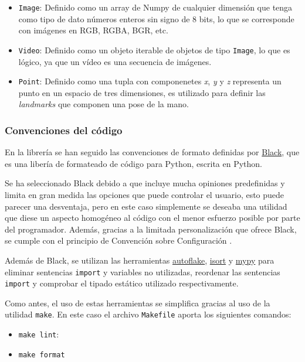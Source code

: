 \begin{itemize}
    \item \texttt{Image}: Definido como un array de Numpy de cualquier dimensión
    que tenga como tipo de dato números enteros sin signo de 8 bits, lo que se
    corresponde con imágenes en RGB, RGBA, BGR, etc.
    \item \texttt{Video}: Definido como un objeto iterable de objetos de tipo
    \texttt{Image}, lo que es lógico, ya que un vídeo es una secuencia de
    imágenes.
    \item \texttt{Point}: Definido como una tupla con componenetes \textit{x},
    \textit{y} y \textit{z} representa un punto en un espacio de tres
    dimensiones, es utilizado para definir las \textit{landmarks} que componen
    una pose de la mano.
\end{itemize}

\subsubsection{Convenciones del código}

En la librería se han seguido las convenciones de formato definidas por
\href{https://github.com/psf/black}{Black}, que es una libería de formateado de
código para Python, escrita en Python.

Se ha seleccionado Black debido a que incluye mucha opiniones predefinidas y
limita en gran medida las opciones que puede controlar el usuario, esto puede
parecer una desventaja, pero en este caso simplemente se deseaba una utilidad
que diese un aspecto homogéneo al código con el menor esfuerzo posible por parte
del programador. Además, gracias a la limitada personalización que ofrece Black,
se cumple con el principio de Convención sobre Configuración
\cite{eswiki:125269135}.

Además de Black, se utilizan las herramientas
\href{https://github.com/PyCQA/autoflake}{autoflake},
\href{https://github.com/PyCQA/isort}{isort} y
\href{https://github.com/python/mypy}{mypy} para eliminar sentencias
\texttt{import} y variables no utilizadas, reordenar las sentencias
\texttt{import} y comprobar el tipado estático utilizado respectivamente.

Como antes, el uso de estas herramientas se simplifica gracias al uso de la
utilidad \texttt{make}. En este caso el archivo \texttt{Makefile} aporta los
siguientes comandos:

\begin{itemize}
    \item \texttt{make lint}:
    \item \texttt{make format}
\end{itemize}

